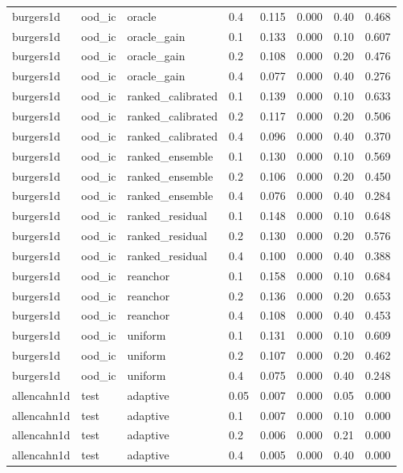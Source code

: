 \begin{longtable}{llllrrrr}
burgers1d & ood\_ic & oracle & 0.4 & 0.115 & 0.000 & 0.40 & 0.468 \\
burgers1d & ood\_ic & oracle\_gain & 0.1 & 0.133 & 0.000 & 0.10 & 0.607 \\
burgers1d & ood\_ic & oracle\_gain & 0.2 & 0.108 & 0.000 & 0.20 & 0.476 \\
burgers1d & ood\_ic & oracle\_gain & 0.4 & 0.077 & 0.000 & 0.40 & 0.276 \\
burgers1d & ood\_ic & ranked\_calibrated & 0.1 & 0.139 & 0.000 & 0.10 & 0.633 \\
burgers1d & ood\_ic & ranked\_calibrated & 0.2 & 0.117 & 0.000 & 0.20 & 0.506 \\
burgers1d & ood\_ic & ranked\_calibrated & 0.4 & 0.096 & 0.000 & 0.40 & 0.370 \\
burgers1d & ood\_ic & ranked\_ensemble & 0.1 & 0.130 & 0.000 & 0.10 & 0.569 \\
burgers1d & ood\_ic & ranked\_ensemble & 0.2 & 0.106 & 0.000 & 0.20 & 0.450 \\
burgers1d & ood\_ic & ranked\_ensemble & 0.4 & 0.076 & 0.000 & 0.40 & 0.284 \\
burgers1d & ood\_ic & ranked\_residual & 0.1 & 0.148 & 0.000 & 0.10 & 0.648 \\
burgers1d & ood\_ic & ranked\_residual & 0.2 & 0.130 & 0.000 & 0.20 & 0.576 \\
burgers1d & ood\_ic & ranked\_residual & 0.4 & 0.100 & 0.000 & 0.40 & 0.388 \\
burgers1d & ood\_ic & reanchor & 0.1 & 0.158 & 0.000 & 0.10 & 0.684 \\
burgers1d & ood\_ic & reanchor & 0.2 & 0.136 & 0.000 & 0.20 & 0.653 \\
burgers1d & ood\_ic & reanchor & 0.4 & 0.108 & 0.000 & 0.40 & 0.453 \\
burgers1d & ood\_ic & uniform & 0.1 & 0.131 & 0.000 & 0.10 & 0.609 \\
burgers1d & ood\_ic & uniform & 0.2 & 0.107 & 0.000 & 0.20 & 0.462 \\
burgers1d & ood\_ic & uniform & 0.4 & 0.075 & 0.000 & 0.40 & 0.248 \\
\midrule
allencahn1d & test & adaptive & 0.05 & 0.007 & 0.000 & 0.05 & 0.000 \\
allencahn1d & test & adaptive & 0.1 & 0.007 & 0.000 & 0.10 & 0.000 \\
allencahn1d & test & adaptive & 0.2 & 0.006 & 0.000 & 0.21 & 0.000 \\
allencahn1d & test & adaptive & 0.4 & 0.005 & 0.000 & 0.40 & 0.000 \\

\end{longtable}
